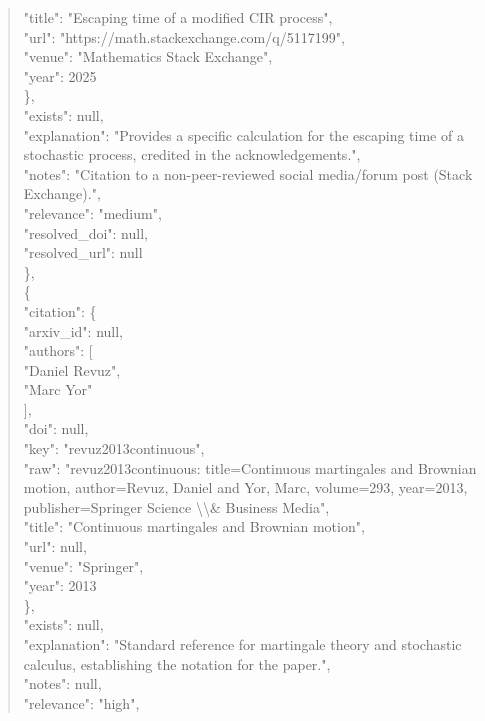 \documentclass[11pt]{article}
\begin{document}
\begin{quote}
        "title": "Escaping time of a modified CIR process",\\
        "url": "https://math.stackexchange.com/q/5117199",\\
        "venue": "Mathematics Stack Exchange",\\
        "year": 2025\\
      \},\\
      "exists": null,\\
      "explanation": "Provides a specific calculation for the escaping time of a stochastic process, credited in the acknowledgements.",\\
      "notes": "Citation to a non-peer-reviewed social media/forum post (Stack Exchange).",\\
      "relevance": "medium",\\
      "resolved\_doi": null,\\
      "resolved\_url": null\\
    \},\\
    \{\\
      "citation": \{\\
        "arxiv\_id": null,\\
        "authors": [\\
          "Daniel Revuz",\\
          "Marc Yor"\\
        ],\\
        "doi": null,\\
        "key": "revuz2013continuous",\\
        "raw": "revuz2013continuous: title=Continuous martingales and Brownian motion, author=Revuz, Daniel and Yor, Marc, volume=293, year=2013, publisher=Springer Science \textbackslash{}\textbackslash{}\& Business Media",\\
        "title": "Continuous martingales and Brownian motion",\\
        "url": null,\\
        "venue": "Springer",\\
        "year": 2013\\
      \},\\
      "exists": null,\\
      "explanation": "Standard reference for martingale theory and stochastic calculus, establishing the notation for the paper.",\\
      "notes": null,\\
      "relevance": "high",\\

\end{quote}
\end{document}
